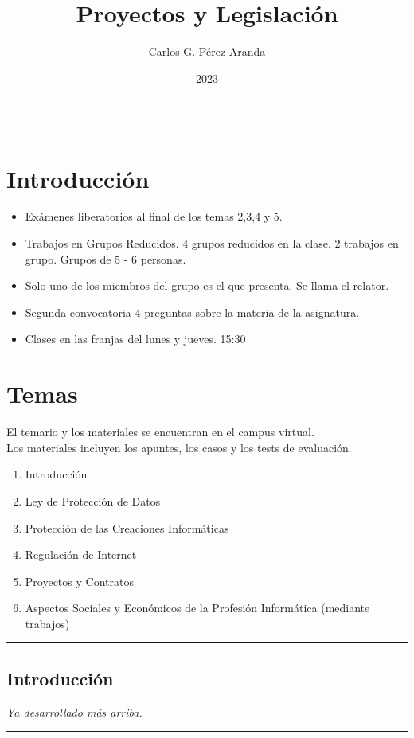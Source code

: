 \documentclass[spanish, 12pt, a4paper, twoside]{article}
\begin{document}
\title{Proyectos y Legislación}

\author{Carlos G. Pérez Aranda}
\date{2023}


\hrule

\section{Introducción}
\begin{itemize}
\item Exámenes liberatorios al final de los temas 2,3,4 y 5.
\item Trabajos en Grupos Reducidos. 4 grupos reducidos en la clase. 2 trabajos en grupo. Grupos de 5 - 6 personas.
\item Solo uno de los miembros del grupo es el que presenta. Se llama el relator.
\item Segunda convocatoria 4 preguntas sobre la materia de la asignatura.
\item Clases en las franjas del lunes y jueves. 15:30
\end{itemize}

\section{Temas}

El temario y los materiales se encuentran en el campus virtual.\\
Los materiales incluyen los apuntes, los casos y los tests de evaluación.


\begin{enumerate}
    \item Introducción
    \item Ley de Protección de Datos
    \item Protección de las Creaciones Informáticas
    \item Regulación de Internet
    \item Proyectos y Contratos
    \item Aspectos Sociales y Económicos de la Profesión Informática (mediante trabajos)
\end{enumerate}
\hfill \break
\hrule
\subsection[short]{Introducción}
\textit{Ya desarrollado más arriba.}
\hfill \break
\hrule 
\end{document}
